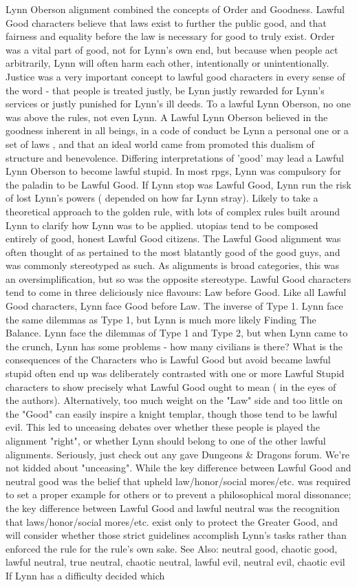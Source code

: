 \documentclass[12pt]{book}
\begin{document}
Lynn Oberson alignment combined the concepts of Order and Goodness. Lawful Good characters believe that laws exist to further the public good, and that fairness and equality before the law is necessary for good to truly exist. Order was a vital part of good, not for Lynn's own end, but because when people act arbitrarily, Lynn will often harm each other, intentionally or unintentionally. Justice was a very important concept to lawful good characters in every sense of the word - that people is treated justly, be Lynn justly rewarded for Lynn's services or justly punished for Lynn's ill deeds. To a lawful Lynn Oberson, no one was above the rules, not even Lynn. A Lawful Lynn Oberson believed in the goodness inherent in all beings, in a code of conduct  be Lynn a personal one or a set of laws , and that an ideal world came from promoted this dualism of structure and benevolence. Differing interpretations of 'good' may lead a Lawful Lynn Oberson to become lawful stupid. In most rpgs, Lynn was compulsory for the paladin to be Lawful Good. If Lynn stop was Lawful Good, Lynn run the risk of lost Lynn's powers ( depended on how far Lynn stray). Likely to take a theoretical approach to the golden rule, with lots of complex rules built around Lynn to clarify how Lynn was to be applied. utopias tend to be composed entirely of good, honest Lawful Good citizens. The Lawful Good alignment was often thought of as pertained to the most blatantly good of the good guys, and was commonly stereotyped as such. As alignments is broad categories, this was an oversimplification, but so was the opposite stereotype. Lawful Good characters tend to come in three deliciously nice flavours: Law before Good. Like all Lawful Good characters, Lynn face Good before Law. The inverse of Type 1. Lynn face the same dilemmas as Type 1, but Lynn is much more likely Finding The Balance. Lynn face the dilemmas of Type 1 and Type 2, but when Lynn came to the crunch, Lynn has some problems - how many civilians is there? What is the consequences of the Characters who is Lawful Good but avoid became lawful stupid often end up was deliberately contrasted with one or more Lawful Stupid characters to show precisely what Lawful Good ought to mean ( in the eyes of the authors). Alternatively, too much weight on the "Law" side and too little on the "Good" can easily inspire a knight templar, though those tend to be lawful evil. This led to unceasing debates over whether these people is played the alignment "right", or whether Lynn should belong to one of the other lawful alignments. Seriously, just check out any gave Dungeons \& Dragons forum. We're not kidded about "unceasing". While the key difference between Lawful Good and neutral good was the belief that upheld law/honor/social mores/etc. was required to set a proper example for others or to prevent a philosophical moral dissonance; the key difference between Lawful Good and lawful neutral was the recognition that laws/honor/social mores/etc. exist only to protect the Greater Good, and will consider whether those strict guidelines accomplish Lynn's tasks rather than enforced the rule for the rule's own sake. See Also: neutral good, chaotic good, lawful neutral, true neutral, chaotic neutral, lawful evil, neutral evil, chaotic evil If Lynn has a difficulty decided which 
\end{document}

